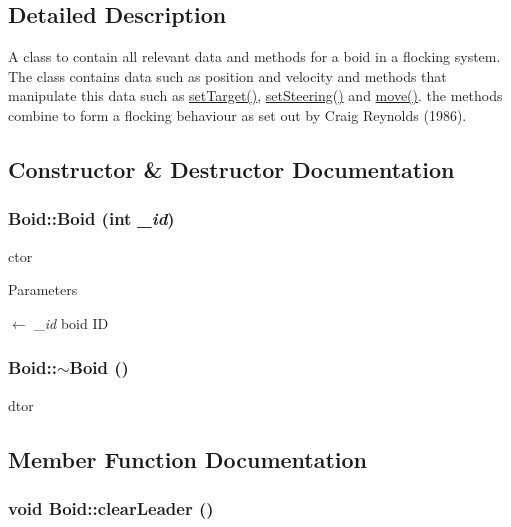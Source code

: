 \subsection{Detailed Description}
A class to contain all relevant data and methods for a boid in a flocking system. The class contains data such as position and velocity and methods that manipulate this data such as \hyperlink{classBoid_aa1144dbf8050c06e5a89db5f84411dd6}{setTarget()}, \hyperlink{classBoid_aa2b619d85612051c88b2e7cc67ac0115}{setSteering()} and \hyperlink{classBoid_ad84ed9152d035b542921547f289024eb}{move()}. the methods combine to form a flocking behaviour as set out by Craig Reynolds (1986). 

\subsection{Constructor \& Destructor Documentation}
\hypertarget{classBoid_a5d1abb62ea2b9f7adc764d648614bf51}{
\subsubsection[{Boid}]{\setlength{\rightskip}{0pt plus 5cm}Boid::Boid (int {\em \_\-id})}}
\label{classBoid_a5d1abb62ea2b9f7adc764d648614bf51}


ctor 
\begin{DoxyParams}{Parameters}
\item[\mbox{$\leftarrow$} {\em \_\-id}]boid ID \end{DoxyParams}
\hypertarget{classBoid_a712f84ddc1b8ad06ad7ecd6c10a1666c}{
\subsubsection[{$\sim$Boid}]{\setlength{\rightskip}{0pt plus 5cm}Boid::$\sim$Boid ()}}
\label{classBoid_a712f84ddc1b8ad06ad7ecd6c10a1666c}


dtor 

\subsection{Member Function Documentation}
\hypertarget{classBoid_a633ee5a5c4ed56ab42f003440bca2771}{
\subsubsection[{clearLeader}]{\setlength{\rightskip}{0pt plus 5cm}void Boid::clearLeader ()}}
\label{classBoid_a633ee5a5c4ed56ab42f003440bca2771}


